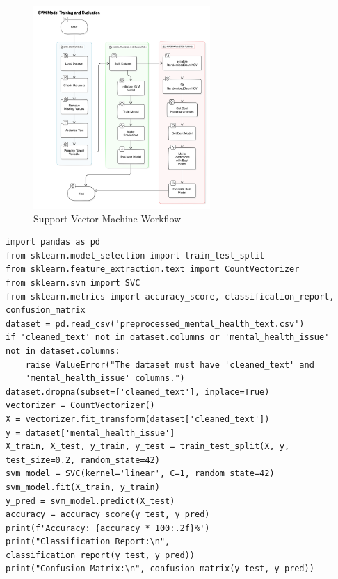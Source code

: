\begin{figure}[h!]  
    \centering
    \includegraphics[width=0.6\textwidth]{Images/SVM.png}  
    \caption{Support Vector Machine Workflow}
    \label{SVM}  %
\end{figure}

\begin{verbatim}
import pandas as pd
from sklearn.model_selection import train_test_split
from sklearn.feature_extraction.text import CountVectorizer
from sklearn.svm import SVC
from sklearn.metrics import accuracy_score, classification_report, 
confusion_matrix
dataset = pd.read_csv('preprocessed_mental_health_text.csv')
if 'cleaned_text' not in dataset.columns or 'mental_health_issue' 
not in dataset.columns:
    raise ValueError("The dataset must have 'cleaned_text' and 
    'mental_health_issue' columns.")
dataset.dropna(subset=['cleaned_text'], inplace=True)
vectorizer = CountVectorizer()
X = vectorizer.fit_transform(dataset['cleaned_text'])
y = dataset['mental_health_issue']
X_train, X_test, y_train, y_test = train_test_split(X, y, 
test_size=0.2, random_state=42)
svm_model = SVC(kernel='linear', C=1, random_state=42)
svm_model.fit(X_train, y_train)
y_pred = svm_model.predict(X_test)
accuracy = accuracy_score(y_test, y_pred)
print(f'Accuracy: {accuracy * 100:.2f}%')
print("Classification Report:\n", 
classification_report(y_test, y_pred))
print("Confusion Matrix:\n", confusion_matrix(y_test, y_pred))
\end{verbatim}

